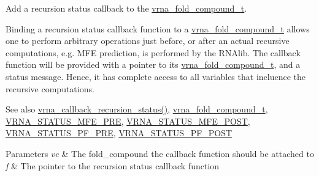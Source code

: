 Add a recursion status callback to the \mbox{\hyperlink{group__fold__compound_ga1b0cef17fd40466cef5968eaeeff6166}{vrna\+\_\+fold\+\_\+compound\+\_\+t}}. 

Binding a recursion status callback function to a \mbox{\hyperlink{group__fold__compound_ga1b0cef17fd40466cef5968eaeeff6166}{vrna\+\_\+fold\+\_\+compound\+\_\+t}} allows one to perform arbitrary operations just before, or after an actual recursive computations, e.\+g. M\+FE prediction, is performed by the R\+N\+Alib. The callback function will be provided with a pointer to its \mbox{\hyperlink{group__fold__compound_ga1b0cef17fd40466cef5968eaeeff6166}{vrna\+\_\+fold\+\_\+compound\+\_\+t}}, and a status message. Hence, it has complete access to all variables that incluence the recursive computations.

\begin{DoxySeeAlso}{See also}
\mbox{\hyperlink{group__fold__compound_gac86036fa8cad1108832335063243cdc8}{vrna\+\_\+callback\+\_\+recursion\+\_\+status()}}, \mbox{\hyperlink{group__fold__compound_ga1b0cef17fd40466cef5968eaeeff6166}{vrna\+\_\+fold\+\_\+compound\+\_\+t}}, \mbox{\hyperlink{group__fold__compound_ga1a5053dc8acbb0111e852988726f07d6}{V\+R\+N\+A\+\_\+\+S\+T\+A\+T\+U\+S\+\_\+\+M\+F\+E\+\_\+\+P\+RE}}, \mbox{\hyperlink{group__fold__compound_ga47c900ca76e56e59e2e83a06e0bde641}{V\+R\+N\+A\+\_\+\+S\+T\+A\+T\+U\+S\+\_\+\+M\+F\+E\+\_\+\+P\+O\+ST}}, \mbox{\hyperlink{group__fold__compound_ga91795d35ebdb6f32be50459f24b3d114}{V\+R\+N\+A\+\_\+\+S\+T\+A\+T\+U\+S\+\_\+\+P\+F\+\_\+\+P\+RE}}, \mbox{\hyperlink{group__fold__compound_ga1c6fa243533fd026e50f7d595eaaa565}{V\+R\+N\+A\+\_\+\+S\+T\+A\+T\+U\+S\+\_\+\+P\+F\+\_\+\+P\+O\+ST}}
\end{DoxySeeAlso}

\begin{DoxyParams}{Parameters}
{\em vc} & The fold\+\_\+compound the callback function should be attached to \\
\hline
{\em f} & The pointer to the recursion status callback function \\
\hline
\end{DoxyParams}
